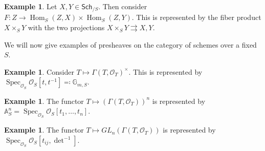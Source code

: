 \documentclass[leqno, openany]{memoir}
\theoremstyle{definition}
\newtheorem{exm}[thm]{Example}
\theoremstyle{remark}
\theoremstyle{plain}
\theoremstyle{definition}
\theoremstyle{remark}
\newcommand{\A}{\mathbb{A}}
\newcommand{\mc}[1]{\mathcal{#1}}
\newcommand{\ms}[1]{\mathsf{#1}}
\DeclareMathOperator{\Hom}{Hom}
\DeclareMathOperator{\Spec}{Spec}
\begin{document}
\begin{exm}
    Let $X,Y \in \ms{Sch}_{/S}$. Then consider $F \colon Z \to \Hom_S(Z,X) \times \Hom_S(Z,Y)$. This is represented by the fiber product $X \times_S Y$ with the two projections $X \times_S Y \rightrightarrows X,Y$.
\end{exm}

We will now give examples of presheaves on the category of schemes over a fixed $S$.

\begin{exm}
    Consider $T \mapsto { \Gamma(T, \mc{O}_T) }^{\times}$. This is represented by $\Spec_{ \mc{O}_S } \mc{O}_S[t, t^{-1}] \eqqcolon \mathbb{G}_{m, S}$.
\end{exm}

\begin{exm}
    The functor $T \mapsto {(\Gamma(T, \mc{O}_T))}^n$ is represented by $\A^n_S = \Spec_{\mc{O}_S} \mc{O}_S[t_1, \ldots, t_n]$.
\end{exm}

\begin{exm}
    The functor $T \mapsto GL_n(\Gamma(T, \mc{O}_T))$ is represented by $\Spec_{\mc{O}_S} \mc{O}_S[t_{ij}, \det^{-1}]$.
\end{exm}
\end{document}
